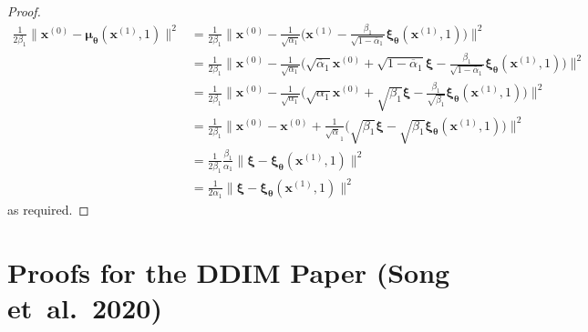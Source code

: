 \documentclass[10pt]{article}
\newcommand{\ve}[1]{\mathbf{#1}}
\newcommand{\ves}[1]{\boldsymbol{#1}}
\newcommand{\etal}{{et~al.}}
\begin{document}
\begin{itemize}
\begin{proof}
\begin{align*}
  \frac{1}{2\beta_1} \big\| \ve{x}^{(0)} - \ves{\mu}_{\ves{\theta}}(\ve{x}^{(1)}, 1) \big\|^2
  &= \frac{1}{2\beta_1} \bigg\| \ve{x}^{(0)} - \frac{1}{\sqrt{\alpha_1}} \bigg( \ve{x}^{(1)} - \frac{\beta_1}{\sqrt{1 - \overline{\alpha}_1}} \ves{\xi}_{\ves{\theta}}(\ve{x}^{(1)},1) \bigg) \bigg\|^2 \\
  &= \frac{1}{2\beta_1} \bigg\| \ve{x}^{(0)} - \frac{1}{\sqrt{\alpha_1}} \bigg( \sqrt{\overline{\alpha}_1} \ve{x}^{(0)} + \sqrt{1 - \overline{\alpha}_1} \ves{\xi} - \frac{\beta_1}{\sqrt{1 - \overline{\alpha}_1}} \ves{\xi}_{\ves{\theta}}(\ve{x}^{(1)},1) \bigg) \bigg\|^2 \\  
  &= \frac{1}{2\beta_1} \bigg\| \ve{x}^{(0)} - \frac{1}{\sqrt{\alpha_1}} \bigg( \sqrt{\alpha_1} \ve{x}^{(0)} + \sqrt{\beta_1} \ves{\xi} - \frac{\beta_1}{\sqrt{\beta_1}} \ves{\xi}_{\ves{\theta}}(\ve{x}^{(1)},1) \bigg) \bigg\|^2 \\
  &= \frac{1}{2\beta_1} \bigg\| \ve{x}^{(0)} - \ve{x}^{(0)} + \frac{1}{\sqrt{\alpha}_1} \bigg( \sqrt{\beta_1} \ves{\xi} - \sqrt{\beta_1} \ves{\xi}_{\ves{\theta}}(\ve{x}^{(1)},1) \bigg) \bigg\|^2 \\
  &= \frac{1}{2\beta_1} \frac{\beta_1}{\alpha_1} \big\| \ves{\xi} - \ves{\xi}_{\ves{\theta}}(\ve{x}^{(1)},1) \big\|^2\\
  &= \frac{1}{2\alpha_1} \big\| \ves{\xi} - \ves{\xi}_{\ves{\theta}}(\ve{x}^{(1)},1) \big\|^2
\end{align*}
as required.
\end{proof}
\end{itemize}

\section{Proofs for the DDIM Paper (Song \etal\ 2020)} \label{sec:ddim-proofs}
\end{document}
